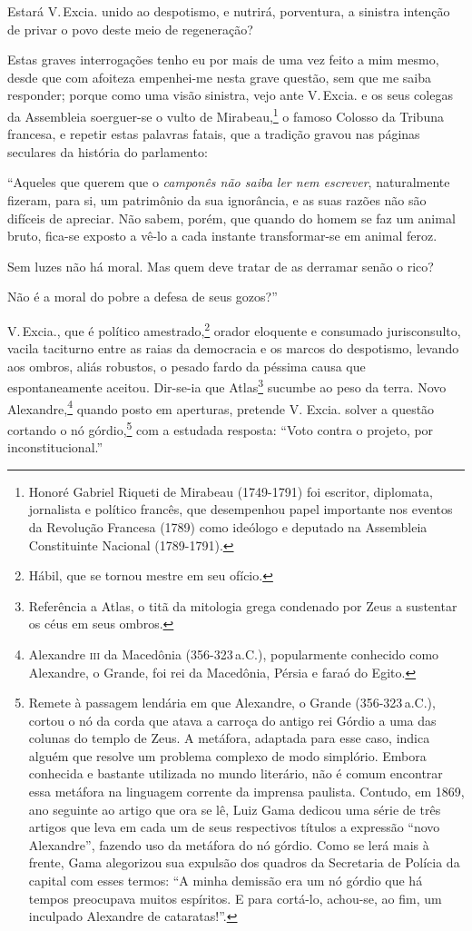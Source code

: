 Estará V.\,Excia. unido ao despotismo, e nutrirá, porventura, a sinistra
intenção de privar o povo deste meio de regeneração?

Estas graves interrogações tenho eu por mais de uma vez feito a mim
mesmo, desde que com afoiteza empenhei-me nesta grave questão, sem que
me saiba responder; porque como uma visão sinistra, vejo ante V.\,Excia.
e os seus colegas da Assembleia soerguer-se o vulto de
Mirabeau,\footnote{Honoré Gabriel Riqueti de Mirabeau (1749-1791) foi
  escritor, diplomata, jornalista e político francês, que desempenhou
  papel importante nos eventos da Revolução Francesa (1789) como
  ideólogo e deputado na Assembleia Constituinte Nacional (1789-1791).}
o famoso Colosso da Tribuna francesa, e repetir estas palavras fatais,
que a tradição gravou nas páginas seculares da história do parlamento:

``Aqueles que querem que o \emph{camponês não saiba ler nem escrever},
naturalmente fizeram, para si, um patrimônio da sua ignorância, e as
suas razões não são difíceis de apreciar. Não sabem, porém, que quando
do homem se faz um animal bruto, fica-se exposto a vê-lo a cada instante
transformar-se em animal feroz.

Sem luzes não há moral. Mas quem deve tratar de as derramar senão o
rico?

Não é a moral do pobre a defesa de seus gozos?''

V.\,Excia., que é político amestrado,\footnote{Hábil, que se tornou
  mestre em seu ofício.} orador eloquente e consumado jurisconsulto,
vacila taciturno entre as raias da democracia e os marcos do despotismo,
levando aos ombros, aliás robustos, o pesado fardo da péssima causa que
espontaneamente aceitou. Dir-se-ia que Atlas\footnote{Referência a
  Atlas, o titã da mitologia grega condenado por Zeus a sustentar os
  céus em seus ombros.} sucumbe ao peso da terra. Novo
Alexandre,\footnote{Alexandre \textsc{iii} da Macedônia (356-323\,a.C.),
  popularmente conhecido como Alexandre, o Grande, foi rei da Macedônia,
  Pérsia e faraó do Egito.} quando posto em aperturas, pretende V.
Excia. solver a questão cortando o nó górdio,\footnote{Remete à
  passagem lendária em que Alexandre, o Grande (356-323\,a.C.), cortou o
  nó da corda que atava a carroça do antigo rei Górdio a uma das colunas
  do templo de Zeus. A metáfora, adaptada para esse caso, indica alguém
  que resolve um problema complexo de modo simplório. Embora conhecida e
  bastante utilizada no mundo literário, não é comum encontrar essa
  metáfora na linguagem corrente da imprensa paulista. Contudo, em 1869,
  ano seguinte ao artigo que ora se lê, Luiz Gama dedicou uma série de
  três artigos que leva em cada um de seus respectivos títulos a
  expressão ``novo Alexandre'', fazendo uso da metáfora do nó górdio. Como
  se lerá mais à frente, Gama alegorizou sua expulsão dos quadros da
  Secretaria de Polícia da capital com esses termos: ``A minha demissão
  era um nó górdio que há tempos preocupava muitos espíritos. E para
  cortá-lo, achou-se, ao fim, um inculpado Alexandre de cataratas!''.\label{gordio}}
com a estudada resposta: ``Voto contra o projeto, por inconstitucional.''

